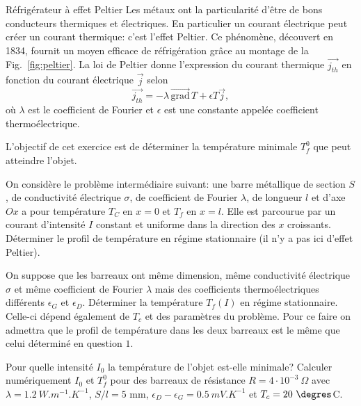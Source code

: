 \begin{exo}[PSI][3]{Réfrigérateur à effet Peltier}
Les métaux ont la particularité d'être de bons conducteurs thermiques et électriques. En particulier un courant électrique peut créer un courant thermique: c'est l'effet Peltier. Ce phénomène, découvert en 1834, fournit un moyen efficace de réfrigération grâce au montage de la Fig.~\ref{fig:peltier}. La loi de Peltier donne l'expression du courant thermique $\vec{j_{th}}$ en fonction du courant électrique $\vec{j}$ selon
\begin{equation}
\vec{j_{th}} = - \lambda \,  \vec{\text{grad}} \, T + \epsilon T \vec{j},
\end{equation}
où $\lambda$ est le coefficient de Fourier et $\epsilon$ est une constante appelée coefficient thermoélectrique.

\begin{center}

\end{center}
L'objectif de cet exercice est de déterminer la température minimale $T_f^0$ que peut atteindre l'objet.

\begin{quest}
	\item On considère le problème intermédiaire suivant: une barre métallique de section $S$, de conductivité électrique $\sigma$, de coefficient de Fourier $\lambda$, de longueur $l$ et d'axe $Ox$ a pour température $T_C$ en $x=0$ et $T_f$ en $x=l$. Elle est parcourue par un courant d'intensité $I$ constant et uniforme dans la direction des $x$ croissants. Déterminer le profil de température en régime stationnaire (il n'y a pas ici d'effet Peltier).
	\item On suppose que les barreaux ont même dimension, même conductivité électrique $\sigma$ et même coefficient de Fourier $\lambda$ mais des coefficients thermoélectriques différents $\epsilon_G$ et $\epsilon_D$. Déterminer la température $T_f(I)$ en régime stationnaire. Celle-ci dépend également de $T_c$ et des paramètres du problème. Pour ce faire on admettra que le profil de température dans les deux barreaux est le même que celui déterminé en question $1$.
	\item Pour quelle intensité $I_0$ la température de l'objet est-elle minimale? Calculer numériquement $I_0$ et $T_f^0$ pour des barreaux de résistance $R= 4 \cdot 10^{-3} ~\Omega$ avec $\lambda = \SI{1,2}{W.m^{-1}.K^{-1}}$, $S/l= 5$ mm, $\epsilon_D-\epsilon_G= \SI{0,5}{mV.K^{-1}}$ et $T_c=20~\degres$C.
\end{quest}
\end{exo}
